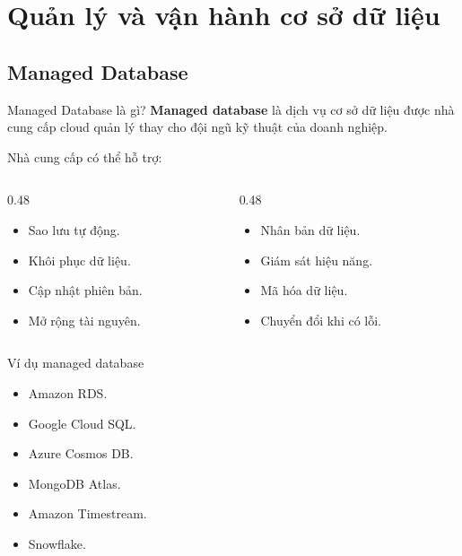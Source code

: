 \documentclass[aspectratio=169,11pt]{beamer}
\newcommand{\keyword}[1]{\textcolor{accent}{\textbf{#1}}}
\newcommand{\kw}[1]{\keyword{#1}}
\newcommand{\smallitem}{\setlength{\itemsep}{2pt}\setlength{\parskip}{0pt}}
\begin{document}
\section{Quản lý và vận hành cơ sở dữ liệu}
\subsection{Managed Database}

\begin{frame}{Managed Database là gì?}
\kw{Managed database} là dịch vụ cơ sở dữ liệu được nhà cung cấp cloud quản lý thay cho đội ngũ kỹ thuật của doanh nghiệp.

\vspace{2mm}
Nhà cung cấp có thể hỗ trợ:
\begin{columns}[T]
\begin{column}{0.48\textwidth}
\begin{itemize}
  \smallitem
  \item Sao lưu tự động.
  \item Khôi phục dữ liệu.
  \item Cập nhật phiên bản.
  \item Mở rộng tài nguyên.
\end{itemize}
\end{column}
\begin{column}{0.48\textwidth}
\begin{itemize}
  \smallitem
  \item Nhân bản dữ liệu.
  \item Giám sát hiệu năng.
  \item Mã hóa dữ liệu.
  \item Chuyển đổi khi có lỗi.
\end{itemize}
\end{column}
\end{columns}
\end{frame}

\begin{frame}{Ví dụ managed database}
\begin{itemize}
  \smallitem
  \item Amazon RDS.
  \item Google Cloud SQL.
  \item Azure Cosmos DB.
  \item MongoDB Atlas.
  \item Amazon Timestream.
  \item Snowflake.
\end{itemize}
\end{frame}
\end{document}
